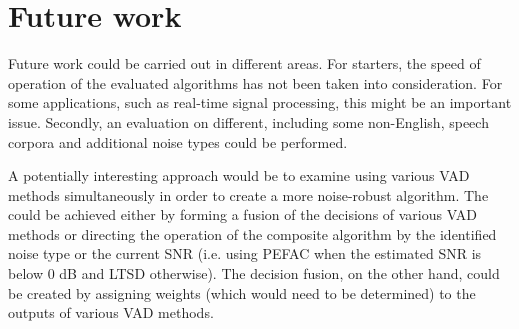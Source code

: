 \section{Future work}

Future work could be carried out in different areas. For starters, the speed of operation of the evaluated algorithms has not been taken into consideration. For some applications, such as real-time signal processing, this might be an important issue. Secondly, an evaluation on different, including some non-English, speech corpora and additional noise types could be performed.

A potentially interesting approach would be to examine using various VAD methods simultaneously in order to create a more noise-robust algorithm. The could be achieved either by forming a fusion of the decisions of various VAD methods or directing the operation of the composite algorithm by the identified noise type or the current SNR (i.e. using PEFAC when the estimated SNR is below 0 dB and LTSD otherwise). The decision fusion, on the other hand, could be created by assigning weights (which would need to be determined) to the outputs of various VAD methods.